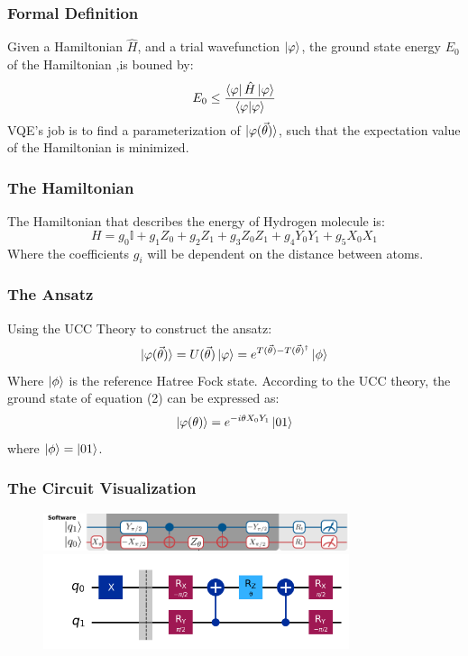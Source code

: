 \documentclass{beamer}
\begin{document}
\begin{frame}
    \frametitle{Formal Definition}
    Given a Hamiltonian \(\hat{H}\), and a trial wavefunction \(\ket{\varphi}\), the ground state energy \(E_0\) of the Hamiltonian ,is bouned by:
    \begin{equation}
        E_0 \leq \frac{\bra{\varphi} \hat{H} \ket{\varphi}}{\braket{\varphi | \varphi}}
    \end{equation}
    VQE's job is to find a parameterization of \(\ket{\varphi(\vec{\theta})}\), such that the expectation value of the Hamiltonian is minimized.
\end{frame}
\begin{frame}
    \frametitle{The Hamiltonian}
    The Hamiltonian that describes the energy of Hydrogen molecule is:
    \begin{equation}
        H = g_0 \mathbb{I} + g_1 Z_0 + g_2 Z_1 + g_3 Z_0 Z_1 + g_4 Y_0 Y_1 + g_5 X_0 X_ 1
    \end{equation}
    Where the coefficients \(g_i\) will be dependent on the distance between atoms. 
\end{frame}
\begin{frame}
    \frametitle{The Ansatz}
    Using the UCC Theory to construct the ansatz: 
    \begin{equation}
        \ket{\varphi(\vec{\theta})} = U(\vec{\theta})\ket{\varphi} = e^{T(\vec{\theta})- T(\vec{\theta})^{\dagger}} \ket{\phi}
    \end{equation}
    Where \(\ket{\phi}\) is the reference Hatree Fock state. According to the UCC theory, the ground state of equation (2) can be expressed as:
    \begin{equation}
        \ket{\varphi(\theta)} = e^{-i\theta X_0 Y_1} \ket{01} 
    \end{equation}
    where \(\ket{\phi} = \ket{01}\). 
\end{frame}
\begin{frame}
    \frametitle{The Circuit Visualization}
    \begin{figure}
        \centering
        \includegraphics[width=0.8\textwidth]{circuit.png}
        \includegraphics[width=0.8\textwidth]{circuit2.png}
    \end{figure}
\end{frame}
\end{document}

